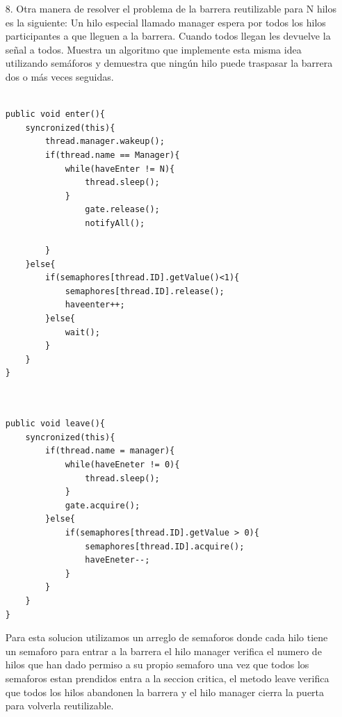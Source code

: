 \documentclass[12pt, letterpaper]{article}
\begin{document}
\begin{itemize}
\begin{itemize}
\begin{center}
\end{center}


\end{itemize}

\newpage

\item[8. ]Otra manera de resolver el problema de la barrera reutilizable para N hilos
es la siguiente: Un hilo especial llamado manager espera por todos los hilos
participantes a que lleguen a la barrera. Cuando todos llegan les devuelve la
señal a todos. Muestra un algoritmo que implemente esta misma idea utilizando
semáforos y demuestra que ningún hilo puede traspasar la barrera dos o más
veces seguidas.
\begin{lstlisting}

public void enter(){
	syncronized(this){
		thread.manager.wakeup();
		if(thread.name == Manager){
			while(haveEnter != N){
				thread.sleep();			
			}
				gate.release();
				notifyAll();			
					
		}	
	}else{
		if(semaphores[thread.ID].getValue()<1){
			semaphores[thread.ID].release();
			haveenter++;		
		}else{
			wait();		
		}
	}
}


\end{lstlisting}

\begin{lstlisting}

public void leave(){
	syncronized(this){
		if(thread.name = manager){
			while(haveEneter != 0){
				thread.sleep();			
			}	
			gate.acquire();
		}else{
			if(semaphores[thread.ID].getValue > 0){
				semaphores[thread.ID].acquire();
				haveEneter--;			
			}
		}
	}
}

\end{lstlisting}

Para esta solucion utilizamos un arreglo de semaforos donde cada hilo tiene un semaforo para entrar a la barrera el hilo manager verifica el numero de hilos que han dado permiso a su propio semaforo una vez que todos los semaforos estan prendidos entra a la seccion critica, el metodo leave verifica que todos los hilos abandonen la barrera y el hilo manager cierra la puerta para volverla reutilizable.


\end{itemize}
\end{document}
